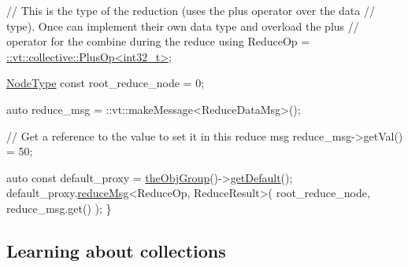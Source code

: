 \begin{DoxyCodeInclude}
  \textcolor{comment}{// This is the type of the reduction (uses the plus operator over the data}
  \textcolor{comment}{// type). Once can implement their own data type and overload the plus}
  \textcolor{comment}{// operator for the combine during the reduce}
  \textcolor{keyword}{using} ReduceOp = \hyperlink{structvt_1_1collective_1_1reduce_1_1operators_1_1_plus_op}{::vt::collective::PlusOp<int32\_t>};

  \hyperlink{namespacevt_a866da9d0efc19c0a1ce79e9e492f47e2}{NodeType} \textcolor{keyword}{const} root\_reduce\_node = 0;

  \textcolor{keyword}{auto} reduce\_msg = ::vt::makeMessage<ReduceDataMsg>();

  \textcolor{comment}{// Get a reference to the value to set it in this reduce msg}
  reduce\_msg->getVal() = 50;

  \textcolor{keyword}{auto} \textcolor{keyword}{const} default\_proxy = \hyperlink{namespacevt_a833f0115b692f578167cbd88e30d39c5}{theObjGroup}()->\hyperlink{structvt_1_1objgroup_1_1_obj_group_manager_a4447b8f4881710bc7b0b7a37de9d10b9}{getDefault}();
  default\_proxy.\hyperlink{structvt_1_1objgroup_1_1proxy_1_1_proxy_3_01void_01_4_a545aeca8f6c0250221796b2138a4583d}{reduceMsg}<ReduceOp, ReduceResult>(
    root\_reduce\_node, reduce\_msg.get()
  );
\}
\end{DoxyCodeInclude}
\hypertarget{tutorial-2a}{}\subsection{Learning about collections}\label{tutorial-2a}

